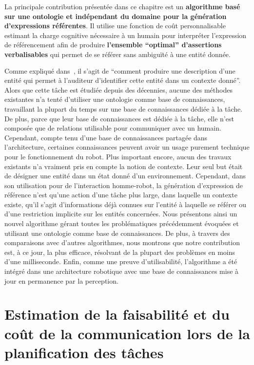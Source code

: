 La principale contribution présentée dans ce chapitre est un \textbf{algorithme basé sur une ontologie et indépendant du domaine pour la génération d'expressions référentes}. Il utilise une fonction de coût personnalisable estimant la charge cognitive nécessaire à un humain pour interpréter l'expression de référencement afin de produire \textbf{l'ensemble ``optimal'' d'assertions verbalisables} qui permet de se référer sans ambiguïté à une entité donnée.


Comme expliqué dans~\cite{reiter_2000_building}, il s'agit de ``comment produire une description d'une entité qui permet à l'auditeur d'identifier cette entité dans un contexte donné''. Alors que cette tâche est étudiée depuis des décennies, aucune des méthodes existantes n'a tenté d'utiliser une ontologie comme base de connaissances, travaillant la plupart du temps sur une base de connaissances dédiée à la tâche. De plus, parce que leur base de connaissances est dédiée à la tâche, elle n'est composée que de relations utilisable pour communiquer avec un humain. Cependant, compte tenu d'une base de connaissances partagée dans l'architecture, certaines connaissances peuvent avoir un usage purement technique pour le fonctionnement du robot. Plus important encore, aucun des travaux existants n'a vraiment pris en compte la notion de contexte. Leur seul but était de désigner une entité dans un état donné d'un environnement. Cependant, dans son utilisation pour de l'interaction homme-robot, la génération d'expression de référence n'est qu'une action d'une tâche plus large, dans laquelle un contexte existe, qu'il s'agit d'informations déjà connues sur l'entité à laquelle se référer ou d'une restriction implicite sur les entités concernées. Nous présentons ainsi un nouvel algorithme gérant toutes les problématiques précédemment évoquées et utilisant une ontologie comme base de connaissances. De plus, à travers des comparaisons avec d'autres algorithmes, nous montrons que notre contribution est, à ce jour, la plus efficace, résolvant de la plupart des problèmes en moins d'une milliseconde. Enfin, comme une preuve d'utilisabilité, l'algorithme a été intégré dans une architecture robotique avec une base de connaissances mise à jour en permanence par la perception. 

\section*{Estimation de la faisabilité et du coût de la communication lors de la planification des tâches}


